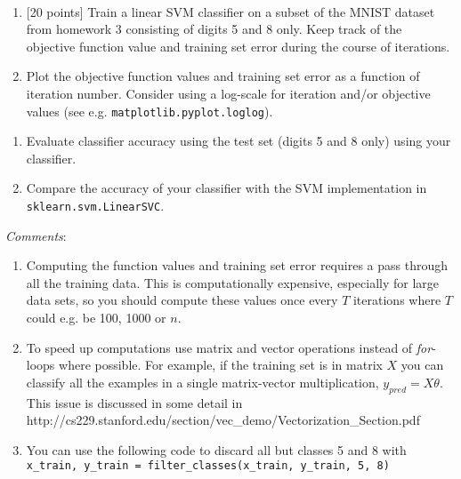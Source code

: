 \documentclass[11pt]{article}
\begin{document}
    \begin{center}
    \end{center}
    { \hspace*{\fill} \\}
    
    \begin{enumerate}
\def\labelenumi{\alph{enumi})}
\setcounter{enumi}{1}
\item
  {[}20 points{]} Train a linear SVM classifier on a subset of the MNIST
  dataset from homework 3 consisting of digits 5 and 8 only. Keep track
  of the objective function value and training set error during the
  course of iterations.
\item
  Plot the objective function values and training set error as a
  function of iteration number. Consider using a log-scale for iteration
  and/or objective values (see e.g. \texttt{matplotlib.pyplot.loglog}).
\end{enumerate}

\begin{enumerate}
\def\labelenumi{\roman{enumi})}
\setcounter{enumi}{1}
\item
  Evaluate classifier accuracy using the test set (digits 5 and 8 only)
  using your classifier.
\item
  Compare the accuracy of your classifier with the SVM implementation in
  \texttt{sklearn.svm.LinearSVC}.
\end{enumerate}

\emph{Comments}:

\begin{enumerate}
\def\labelenumi{\arabic{enumi})}
\item
  Computing the function values and training set error requires a pass
  through all the training data. This is computationally expensive,
  especially for large data sets, so you should compute these values
  once every \(T\) iterations where \(T\) could e.g. be 100, 1000 or
  \(n\).
\item
  To speed up computations use matrix and vector operations instead of
  \emph{for}-loops where possible. For example, if the training set is
  in matrix \(X\) you can classify all the examples in a single
  matrix-vector multiplication, \(y_{pred}=X\theta\). This issue is
  discussed in some detail in
  http://cs229.stanford.edu/section/vec\_demo/Vectorization\_Section.pdf
\item
  You can use the following code to discard all but classes 5 and 8 with
  \texttt{x\_train,\ y\_train\ =\ filter\_classes(x\_train,\ y\_train,\ 5,\ 8)}
\end{enumerate}
\end{document}
